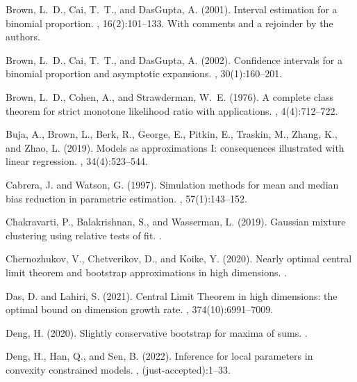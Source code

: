 \documentclass{article}
\numberwithin{myalgctr}{section}
\begin{document}
\begin{thebibliography}{}
Brown, L.~D., Cai, T.~T., and DasGupta, A. (2001).
\newblock Interval estimation for a binomial proportion.
, 16(2):101--133.
\newblock With comments and a rejoinder by the authors.

Brown, L.~D., Cai, T.~T., and DasGupta, A. (2002).
\newblock Confidence intervals for a binomial proportion and asymptotic
  expansions.
, 30(1):160--201.

Brown, L.~D., Cohen, A., and Strawderman, W.~E. (1976).
\newblock A complete class theorem for strict monotone likelihood ratio with
  applications.
, 4(4):712--722.

Buja, A., Brown, L., Berk, R., George, E., Pitkin, E., Traskin, M., Zhang, K.,
  and Zhao, L. (2019).
\newblock Models as approximations {I}: consequences illustrated with linear
  regression.
, 34(4):523--544.

Cabrera, J. and Watson, G. (1997).
\newblock Simulation methods for mean and median bias reduction in parametric
  estimation.
, 57(1):143--152.

Chakravarti, P., Balakrishnan, S., and Wasserman, L. (2019).
\newblock Gaussian mixture clustering using relative tests of fit.
.

Chernozhukov, V., Chetverikov, D., and Koike, Y. (2020).
\newblock Nearly optimal central limit theorem and bootstrap approximations in
  high dimensions.
.

Das, D. and Lahiri, S. (2021).
\newblock Central {L}imit {T}heorem in high dimensions: the optimal bound on
  dimension growth rate.
, 374(10):6991--7009.

Deng, H. (2020).
\newblock Slightly conservative bootstrap for maxima of sums.
.

Deng, H., Han, Q., and Sen, B. (2022).
\newblock Inference for local parameters in convexity constrained models.
,
  (just-accepted):1--33.


\end{thebibliography}
\end{document}
